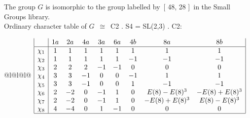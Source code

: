 \documentclass[varwidth=\maxdimen,border=10]{standalone}
\begin{document}
The group $G$ is isomorphic to the group labelled by\ [ 48, 28 ]\ in the Small Groups library.\\
Ordinary character table of $G$\ $\cong$\ C2 . S4 = SL(2,3) . C2:\\
\begin{center}
\begin{tabular}{@{}l@{}l@{}l@{}}
\hline
\(\begin{array}{|l|cccccccc|}
  & 1a & 2a & 4a & 3a & 6a & 4b & 8a & 8b\\ \hline
\chi_{1} & 1 & 1 & 1 & 1 & 1 & 1 & 1 & 1\\
\chi_{2} & 1 & 1 & 1 & 1 & 1 & -1 & -1 & -1\\
\chi_{3} & 2 & 2 & 2 & -1 & -1 & 0 & 0 & 0\\
\chi_{4} & 3 & 3 & -1 & 0 & 0 & -1 & 1 & 1\\
\chi_{5} & 3 & 3 & -1 & 0 & 0 & 1 & -1 & -1\\
\chi_{6} & 2 & -2 & 0 & -1 & 1 & 0 & E(8)-E(8)^{3} & -E(8)+E(8)^{3}\\
\chi_{7} & 2 & -2 & 0 & -1 & 1 & 0 & -E(8)+E(8)^{3} & E(8)-E(8)^{3}\\
\chi_{8} & 4 & -4 & 0 & 1 & -1 & 0 & 0 & 0\\
\hline
\end{array}\)\\
\end{tabular}
\end{center}
\end{document}
